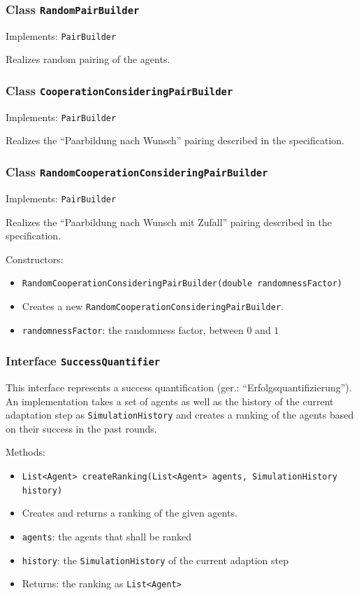 \documentclass[parskip=full,11pt]{scrartcl}
\begin{document}
\subsubsection{Class \texttt{RandomPairBuilder}}
Implements: \texttt{PairBuilder}

Realizes random pairing of the agents.

\subsubsection{Class \texttt{CooperationConsideringPairBuilder}}
Implements: \texttt{PairBuilder}

Realizes the \enquote{Paarbildung nach Wunsch} pairing described in the specification.

\subsubsection{Class \texttt{RandomCooperationConsideringPairBuilder}}
Implements: \texttt{PairBuilder}

Realizes the \enquote{Paarbildung nach Wunsch mit Zufall} pairing described in the specification.


Constructors:
\begin{itemize}\itemsep -10pt
\item \texttt{RandomCooperationConsideringPairBuilder(double randomnessFactor)}
\item[] Creates a new \texttt{RandomCooperationConsideringPairBuilder}.
\item[] \texttt{randomnessFactor}: the randomness factor, between \(0\) and \(1\)
\end{itemize}

\subsubsection{Interface \texttt{SuccessQuantifier}}

This interface represents a success quantification (ger.: \enquote{Erfolgsquantifizierung}). An implementation takes a set of agents as well as the history of the current adaptation step as \texttt{SimulationHistory} and creates a ranking of the agents based on their success in the past rounds.

Methods:
\begin{itemize}\itemsep -10pt
\item \texttt{List<Agent> createRanking(List<Agent> agents, SimulationHistory history)}
\item[] Creates and returns a ranking of the given agents.
\item[] \texttt{agents}: the agents that shall be ranked
\item[] \texttt{history}: the \texttt{SimulationHistory} of the current adaption step
\item[] Returns: the ranking as \texttt{List<Agent>}
\end{itemize}
\end{document}
